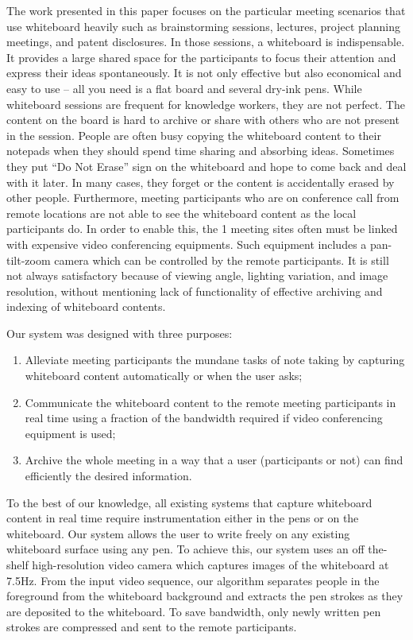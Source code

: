The work presented in this paper focuses on the particular meeting scenarios that use whiteboard heavily such as brainstorming sessions, lectures, project planning meetings, and patent disclosures. In those sessions, a whiteboard is indispensable. It provides a large shared space for the participants to focus their attention and express their ideas spontaneously. It is not only effective but also economical and easy to use – all you need is a flat board and several dry-ink pens. While whiteboard sessions are frequent for knowledge workers, they are not perfect. The content on the board is hard to archive or share with others who are not present in the session. People are often busy copying the whiteboard content to their notepads when they should spend time sharing and absorbing ideas. Sometimes they put “Do Not Erase” sign on the whiteboard and hope to come back and deal with it later. In many cases, they forget or the content is accidentally erased by other people. Furthermore, meeting participants who are on conference call from remote locations are not able to see the whiteboard content as the local participants do. In order to enable this, the 1 meeting sites often must be linked with expensive video conferencing equipments. Such equipment includes a pan-tilt-zoom camera which can be controlled by the remote participants. It is still not always satisfactory because of viewing angle, lighting variation, and image resolution, without mentioning lack of functionality of effective archiving and indexing of whiteboard contents. 

Our system was designed with three purposes: 
\begin{enumerate}
    \item Alleviate meeting participants the mundane tasks of note taking by capturing whiteboard content automatically or when the user asks;
    \item Communicate the whiteboard content to the remote meeting participants in real time using a fraction of the bandwidth required if video conferencing equipment is used;
    \item Archive the whole meeting in a way that a user (participants or not) can find efficiently the desired information. 
\end{enumerate}

To the best of our knowledge, all existing systems that capture whiteboard content in real time require instrumentation either in the pens or on the whiteboard. Our system allows the user to write freely on any existing whiteboard surface using any pen. To achieve this, our system uses an off the-shelf high-resolution video camera which captures images of the whiteboard at 7.5Hz. From the input video sequence, our algorithm separates people in the foreground from the whiteboard background and extracts the pen strokes as they are deposited to the whiteboard. To save bandwidth, only newly written pen strokes are compressed and sent to the remote participants.


